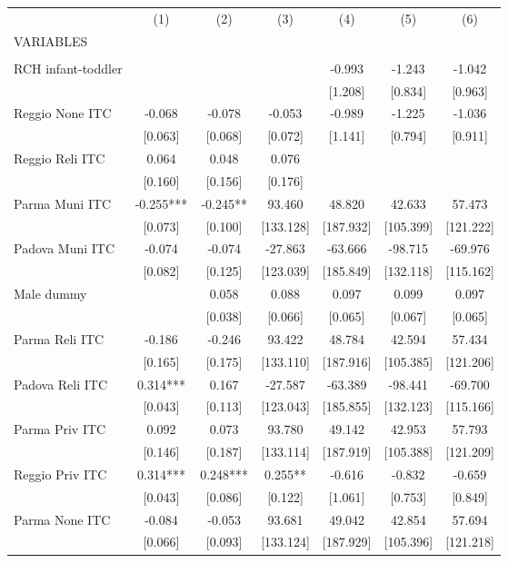 \begin{tabular}{lcccccc} \hline
 & (1) & (2) & (3) & (4) & (5) & (6) \\
VARIABLES &  &  &  &  &  &  \\ \hline
 &  &  &  &  &  &  \\
RCH infant-toddler &  &  &  & -0.993 & -1.243 & -1.042 \\
 &  &  &  & [1.208] & [0.834] & [0.963] \\
Reggio None ITC & -0.068 & -0.078 & -0.053 & -0.989 & -1.225 & -1.036 \\
 & [0.063] & [0.068] & [0.072] & [1.141] & [0.794] & [0.911] \\
Reggio Reli ITC & 0.064 & 0.048 & 0.076 &  &  &  \\
 & [0.160] & [0.156] & [0.176] &  &  &  \\
Parma Muni ITC & -0.255*** & -0.245** & 93.460 & 48.820 & 42.633 & 57.473 \\
 & [0.073] & [0.100] & [133.128] & [187.932] & [105.399] & [121.222] \\
Padova Muni ITC & -0.074 & -0.074 & -27.863 & -63.666 & -98.715 & -69.976 \\
 & [0.082] & [0.125] & [123.039] & [185.849] & [132.118] & [115.162] \\
Male dummy &  & 0.058 & 0.088 & 0.097 & 0.099 & 0.097 \\
 &  & [0.038] & [0.066] & [0.065] & [0.067] & [0.065] \\
Parma Reli ITC & -0.186 & -0.246 & 93.422 & 48.784 & 42.594 & 57.434 \\
 & [0.165] & [0.175] & [133.110] & [187.916] & [105.385] & [121.206] \\
Padova Reli ITC & 0.314*** & 0.167 & -27.587 & -63.389 & -98.441 & -69.700 \\
 & [0.043] & [0.113] & [123.043] & [185.855] & [132.123] & [115.166] \\
Parma Priv ITC & 0.092 & 0.073 & 93.780 & 49.142 & 42.953 & 57.793 \\
 & [0.146] & [0.187] & [133.114] & [187.919] & [105.388] & [121.209] \\
Reggio Priv ITC & 0.314*** & 0.248*** & 0.255** & -0.616 & -0.832 & -0.659 \\
 & [0.043] & [0.086] & [0.122] & [1.061] & [0.753] & [0.849] \\
Parma None ITC & -0.084 & -0.053 & 93.681 & 49.042 & 42.854 & 57.694 \\
 & [0.066] & [0.093] & [133.124] & [187.929] & [105.396] & [121.218] \\

\end{tabular}
